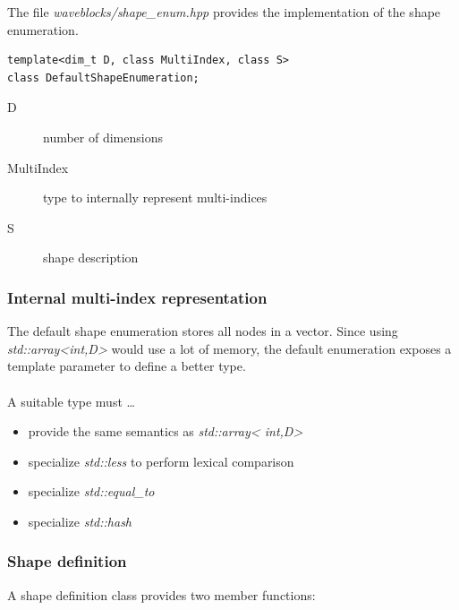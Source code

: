 \documentclass{article}
\begin{document}
The file \emph{waveblocks/shape\_enum.hpp} provides the implementation of the shape enumeration.

\begin{verbatim}
template<dim_t D, class MultiIndex, class S>
class DefaultShapeEnumeration;
\end{verbatim}

\begin{description}
\item[D] number of dimensions
\item[MultiIndex] type to internally represent multi-indices
\item[S] shape description
\end{description}

\subsubsection{Internal multi-index representation}
The default shape enumeration stores all nodes in a vector. Since
using \emph{std::array\textless int,D\textgreater} would use a lot of
memory, the default enumeration exposes a template parameter to define
a better type. \\ \\ A suitable type must \dots
\begin{itemize}
\item provide the same semantics as \emph{std::array\textless
    int,D\textgreater}
\item specialize \emph{std::less} to perform lexical comparison
\item specialize \emph{std::equal\_to}
\item specialize \emph{std::hash}
\end{itemize}

\subsubsection{Shape definition}
A shape definition class provides two member functions:
\end{document}
